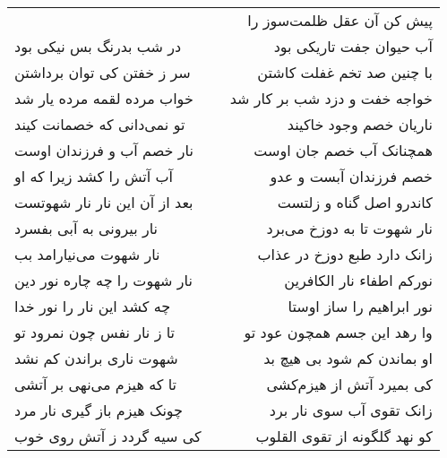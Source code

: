 \begin{center}
\begin{longtable}{l p{0.5cm} r}
&&
پیش کن آن عقل ظلمت‌سوز را
\\
در شب بدرنگ بس نیکی بود
&&
آب حیوان جفت تاریکی بود
\\
سر ز خفتن کی توان برداشتن
&&
با چنین صد تخم غفلت کاشتن
\\
خواب مرده لقمه مرده یار شد
&&
خواجه خفت و دزد شب بر کار شد
\\
تو نمی‌دانی که خصمانت کیند
&&
ناریان خصم وجود خاکیند
\\
نار خصم آب و فرزندان اوست
&&
همچنانک آب خصم جان اوست
\\
آب آتش را کشد زیرا که او
&&
خصم فرزندان آبست و عدو
\\
بعد از آن این نار نار شهوتست
&&
کاندرو اصل گناه و زلتست
\\
نار بیرونی به آبی بفسرد
&&
نار شهوت تا به دوزخ می‌برد
\\
نار شهوت می‌نیارامد بب
&&
زانک دارد طبع دوزخ در عذاب
\\
نار شهوت را چه چاره نور دین
&&
نورکم اطفاء نار الکافرین
\\
چه کشد این نار را نور خدا
&&
نور ابراهیم را ساز اوستا
\\
تا ز نار نفس چون نمرود تو
&&
وا رهد این جسم همچون عود تو
\\
شهوت ناری براندن کم نشد
&&
او بماندن کم شود بی هیچ بد
\\
تا که هیزم می‌نهی بر آتشی
&&
کی بمیرد آتش از هیزم‌کشی
\\
چونک هیزم باز گیری نار مرد
&&
زانک تقوی آب سوی نار برد
\\
کی سیه گردد ز آتش روی خوب
&&
کو نهد گلگونه از تقوی القلوب
\\
\end{longtable}
\end{center}
